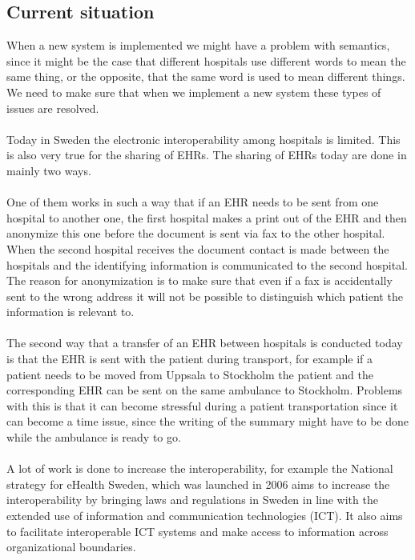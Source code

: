 \documentclass[14pt]{article}
\begin{document}
\subsection{Current situation} %
When a new system is implemented we might have a problem with semantics, since it might be the case that different hospitals use different words to mean the same thing, or the opposite, that the same word is used to mean different things. We need to make sure that when we implement a new system these types of issues are resolved.~\cite{Empirica}
\\\\
Today in Sweden the electronic \gls{interoperability} among hospitals is limited. This is also very true for the sharing of \glspl{EHR}. The sharing of \glspl{EHR} today are done in mainly two ways.
\\\\
One of them works in such a way that if an \gls{EHR} needs to be sent from one hospital to another one, the first hospital makes a print out of the \gls{EHR} and then anonymize this one before the document is sent via fax to the other hospital. When the second hospital receives the document contact is made between the hospitals and the identifying information is communicated to the second hospital.\cite{EPJ2} The reason for anonymization is to make sure that even if a fax is accidentally sent to the wrong address it will not be possible to distinguish which patient the information is relevant to.
\\\\
The second way that a transfer of an \gls{EHR} between hospitals is conducted today is that the \gls{EHR} is sent with the patient during transport, for example if a patient needs to be moved from Uppsala to Stockholm the patient and the corresponding \gls{EHR} can be sent on the same ambulance to Stockholm\cite{EPJ2}. Problems with this is that it can become stressful during a patient transportation since it can become a time issue, since the writing of the summary might have to be done while the ambulance is ready to go\cite{EPJ2}.
\\\\
A lot of work is done to increase the \gls{interoperability}, for example the National strategy for eHealth Sweden, which was launched in 2006 aims to increase the interoperability by bringing laws and regulations in Sweden in line with the extended use of information and communication technologies (ICT). It also aims to facilitate interoperable ICT systems and make access to information across organizational boundaries\cite{NationalStrategy}. 
\end{document}
